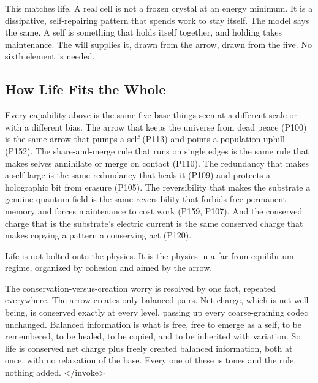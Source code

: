 This matches life. A real cell is not a frozen crystal at an energy minimum. It is a dissipative, self-repairing pattern that spends work to stay itself. The model says the same. A self is something that holds itself together, and holding takes maintenance. The will supplies it, drawn from the arrow, drawn from the five. No sixth element is needed.

\subsection{How Life Fits the Whole}

Every capability above is the same five base things seen at a different scale or with a different bias. The arrow that keeps the universe from dead peace (P100) is the same arrow that pumps a self (P113) and points a population uphill (P152). The share-and-merge rule that runs on single edges is the same rule that makes selves annihilate or merge on contact (P110). The redundancy that makes a self large is the same redundancy that heals it (P109) and protects a holographic bit from erasure (P105). The reversibility that makes the substrate a genuine quantum field is the same reversibility that forbids free permanent memory and forces maintenance to cost work (P159, P107). And the conserved charge that is the substrate's electric current is the same conserved charge that makes copying a pattern a conserving act (P120).

Life is not bolted onto the physics. It is the physics in a far-from-equilibrium regime, organized by cohesion and aimed by the arrow.

The conservation-versus-creation worry is resolved by one fact, repeated everywhere. The arrow creates only balanced pairs. Net charge, which is net well-being, is conserved exactly at every level, passing up every coarse-graining codec unchanged. Balanced information is what is free, free to emerge as a self, to be remembered, to be healed, to be copied, and to be inherited with variation. So life is conserved net charge plus freely created balanced information, both at once, with no relaxation of the base. Every one of these is tones and the rule, nothing added.
</invoke>

